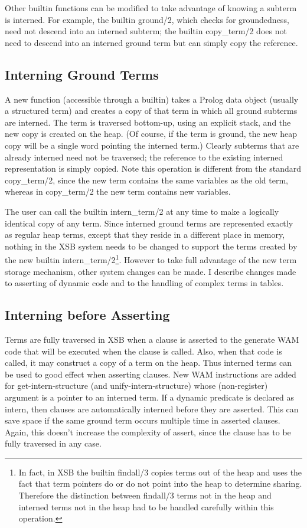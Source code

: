 \documentclass{llncs}
\begin{document}
Other builtin functions can be modified to take advantage of knowing a
subterm is interned.  For example, the builtin ground/2, which checks
for groundedness, need not descend into an interned subterm; the
builtin copy\_term/2 does not need to descend into an interned ground
term but can simply copy the reference.

\subsection{Interning Ground Terms}
A new function (accessible through a builtin) takes a Prolog data
object (usually a structured term) and creates a copy of that term in
which all ground subterms are interned.  The term is traversed
bottom-up, using an explicit stack, and the new copy is created on the
heap.  (Of course, if the term is ground, the new heap copy will be a
single word pointing the interned term.)  Clearly subterms that are
already interned need not be traversed; the reference to the existing
interned representation is simply copied.  Note this operation is
different from the standard copy\_term/2, since the new term contains
the same variables as the old term, whereas in copy\_term/2 the new
term contains new variables.

The user can call the builtin intern\_term/2 at any time to make a
logically identical copy of any term.  Since interned ground terms are
represented exactly as regular heap terms, except that they reside in
a different place in memory, nothing in the XSB system needs to be
changed to support the terms created by the new builtin
intern\_term/2\footnote{In fact, in XSB the builtin findall/3 copies
terms out of the heap and uses the fact that term pointers do or do
not point into the heap to determine sharing.  Therefore the
distinction between findall/3 terms not in the heap and interned terms
not in the heap had to be handled carefully within this operation.}.
However to take full advantage of the new term storage mechanism,
other system changes can be made.  I describe changes made to
asserting of dynamic code and to the handling of complex terms in
tables.

\subsection{Interning before Asserting}

Terms are fully traversed in XSB when a clause is asserted to the
generate WAM code that will be executed when the clause is called.
Also, when that code is called, it may construct a copy of a term on
the heap.  Thus interned terms can be used to good effect when
asserting clauses.  New WAM instructions are added for
get-intern-structure (and unify-intern-structure) whose (non-register)
argument is a pointer to an interned term.  If a dynamic predicate is
declared as intern, then clauses are automatically interned before
they are asserted.  This can save space if the same ground term occurs
multiple time in asserted clauses.  Again, this doesn't increase the
complexity of assert, since the clause has to be fully traversed in
any case.
\end{document}
